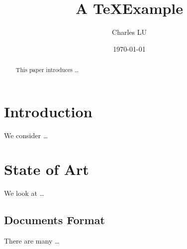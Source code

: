 \documentclass[a4paper,11pt]{article}
\author{Charles LU}
\title{A \TeX Example}
\date{\today}
\begin{document}
\maketitle
\tableofcontents

\begin{abstract}
This paper introduces \ldots
\end{abstract}

\section{Introduction}
We consider \ldots

\section{State of Art}
We look at \ldots

\subsection{Documents Format}
There are many \dots
\end{document}
